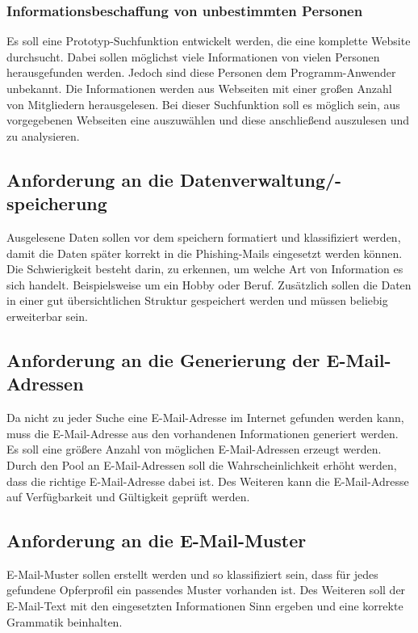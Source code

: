 		\subsubsection{Informationsbeschaffung von unbestimmten Personen}
		Es soll eine Prototyp-Suchfunktion entwickelt werden, die eine komplette Website durchsucht. Dabei sollen möglichst viele Informationen von vielen Personen herausgefunden werden. Jedoch sind diese Personen dem Programm-Anwender unbekannt. Die Informationen werden aus Webseiten mit einer großen Anzahl von Mitgliedern herausgelesen. Bei dieser Suchfunktion soll es möglich sein, aus vorgegebenen Webseiten eine auszuwählen und diese anschließend auszulesen und zu analysieren.
		
	\subsection{Anforderung an die Datenverwaltung/-speicherung}
	Ausgelesene Daten sollen vor dem speichern formatiert und klassifiziert werden, damit die Daten später korrekt in die Phishing-Mails eingesetzt werden können. Die Schwierigkeit besteht darin, zu erkennen, um welche Art von Information es sich handelt. Beispielsweise um ein Hobby oder Beruf. Zusätzlich sollen die Daten in einer gut übersichtlichen Struktur gespeichert werden und müssen beliebig erweiterbar sein.
	
	\subsection{Anforderung an die Generierung der E-Mail-Adressen}
	Da nicht zu jeder Suche eine E-Mail-Adresse im Internet gefunden werden kann, muss die E-Mail-Adresse aus den vorhandenen Informationen generiert werden. Es soll eine größere Anzahl von möglichen E-Mail-Adressen erzeugt werden. Durch den Pool an E-Mail-Adressen soll die Wahrscheinlichkeit erhöht werden, dass die richtige E-Mail-Adresse dabei ist. Des Weiteren kann die E-Mail-Adresse auf Verfügbarkeit und Gültigkeit geprüft werden.
	
	\subsection{Anforderung an die E-Mail-Muster}
	E-Mail-Muster sollen erstellt werden und so klassifiziert sein, dass für jedes gefundene Opferprofil ein passendes Muster vorhanden ist. Des Weiteren soll der E-Mail-Text mit den eingesetzten Informationen Sinn ergeben und eine korrekte Grammatik beinhalten.
	
